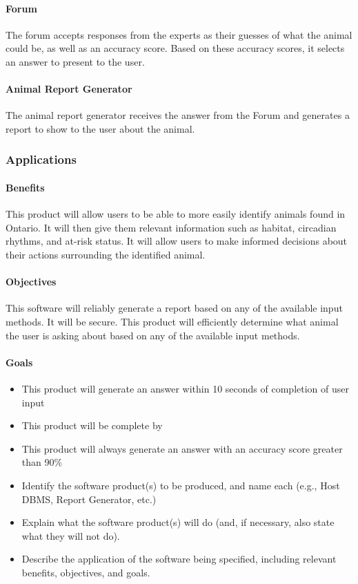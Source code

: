 \documentclass[]{article}
\begin{document}
\paragraph{Forum}
The forum accepts responses from the experts as their guesses of what the animal could be, as well as an accuracy score. Based on these accuracy scores, it selects an answer to present to the user.
\paragraph{Animal Report Generator}
The animal report generator receives the answer from the Forum and generates a report to show to the user about the animal.
\subsubsection{Applications}
\paragraph{Benefits}
This product will allow users to be able to more easily identify animals found in Ontario. It will then give them relevant information such as habitat, circadian rhythms, and at-risk status.
It will allow users to make informed decisions about their actions surrounding the identified animal.
\paragraph{Objectives}
This software will reliably generate a report based on any of the available input methods. It will be secure. This product will efficiently determine what animal the user is asking about based on any of the available input methods.
\paragraph{Goals}
\begin{itemize}
	\item This product will generate an answer within 10 seconds of completion of user input
	\item This product will be complete by
	\item This product will always generate an answer with an accuracy score greater than 90\%
\end{itemize}

\begin{itemize}
	\item Identify the software product(s) to be produced, and name each (e.g., Host DBMS, Report Generator, etc.)
	\item Explain what the software product(s) will do (and, if necessary, also state what they will not do).
	\item Describe the application of the software being specified, including relevant benefits, objectives, and goals.
\end{itemize}
\end{document}
